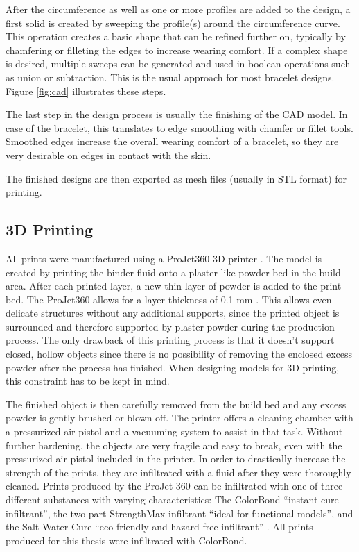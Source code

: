 After the circumference as well as one or more profiles are added to the design, a first solid is created by sweeping the profile(s) around the circumference curve. This operation creates a basic shape that can be refined further on, typically by chamfering or filleting the edges to increase wearing comfort. If a complex shape is desired, multiple sweeps can be generated and used in boolean operations such as union or subtraction. This is the usual approach for most bracelet designs. Figure \ref{fig:cad} illustrates these steps.

The last step in the design process is usually the finishing of the \ac{CAD} model. In case of the bracelet, this translates to edge smoothing with chamfer or fillet tools. Smoothed edges increase the overall wearing comfort of a bracelet, so they are very desirable on edges in contact with the skin.

The finished designs are then exported as mesh files (usually in \ac{STL} format) for printing.

\subsection{3D Printing}
All prints were manufactured using a ProJet360 3D printer \cite{printer}. The model is created by printing the binder fluid onto a plaster-like powder bed in the build area. After each printed layer, a new thin layer of powder is added to the print bed. The ProJet360 allows for a layer thickness of 0.1 mm \cite{datasheet_printer}. This allows even delicate structures without any additional supports, since the printed object is surrounded and therefore supported by plaster powder during the production process. The only drawback of this printing process is that it doesn't support closed, hollow objects since there is no possibility of removing the enclosed excess powder after the process has finished. When designing models for 3D printing, this constraint has to be kept in mind.

The finished object is then carefully removed from the build bed and any excess powder is gently brushed or blown off. The printer offers a cleaning chamber with a pressurized air pistol and a vacuuming system to assist in that task. Without further hardening, the objects are very fragile and easy to break, even with the pressurized air pistol included in the printer. In order to drastically increase the strength of the prints, they are infiltrated with a fluid after they were thoroughly cleaned. Prints produced by the ProJet 360 can be infiltrated with one of three different substances with varying characteristics: The ColorBond ``instant-cure infiltrant'', the two-part StrengthMax infiltrant ``ideal for functional models'', and the Salt Water Cure ``eco-friendly and hazard-free infiltrant'' \cite{datasheet_printer}. All prints produced for this thesis were infiltrated with ColorBond.

